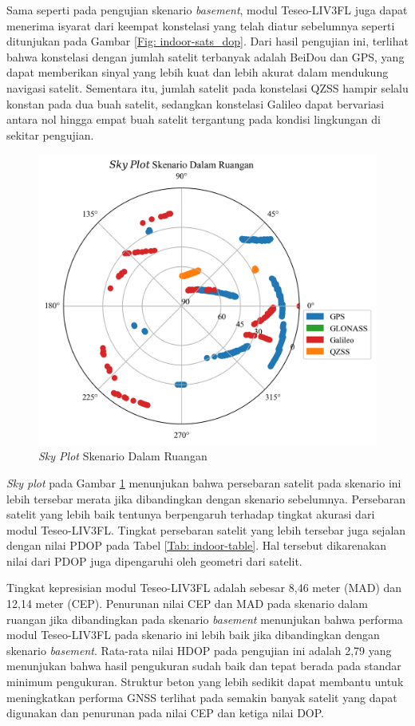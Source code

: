 Sama seperti pada pengujian skenario \textit{basement}, modul Teseo-LIV3FL juga dapat menerima isyarat dari keempat konstelasi yang telah diatur sebelumnya seperti ditunjukan pada Gambar \ref{Fig: indoor-sats_dop}. Dari hasil pengujian ini, terlihat bahwa konstelasi dengan jumlah satelit terbanyak adalah BeiDou dan GPS, yang dapat memberikan sinyal yang lebih kuat dan lebih akurat dalam mendukung navigasi satelit. Sementara itu, jumlah satelit pada konstelasi QZSS hampir selalu konstan pada dua buah satelit, sedangkan konstelasi Galileo dapat bervariasi antara nol hingga empat buah satelit tergantung pada kondisi lingkungan di sekitar pengujian. 

\begin{figure}[H]
	\centering
	\captionsetup{justification=centering}
	\includegraphics[width=12cm]{contents/chapter-4/2-skenario-indoor/sky_plot.png}
	\caption{\textit{Sky Plot} Skenario Dalam Ruangan}
	\label{Fig: indoor-sky_plot}
\end{figure}

\textit{Sky plot} pada Gambar \ref{Fig: indoor-sky_plot} menunjukan bahwa persebaran satelit pada skenario ini lebih tersebar merata jika dibandingkan dengan skenario sebelumnya. Persebaran satelit yang lebih baik tentunya berpengaruh terhadap tingkat akurasi dari modul Teseo-LIV3FL. Tingkat persebaran satelit yang lebih tersebar juga sejalan dengan nilai PDOP pada Tabel \ref{Tab: indoor-table}. Hal tersebut dikarenakan nilai dari PDOP juga dipengaruhi oleh geometri dari satelit.

Tingkat kepresisian modul Teseo-LIV3FL adalah sebesar 8,46 meter (MAD) dan 12,14 meter (CEP). Penurunan nilai CEP dan MAD pada skenario dalam ruangan jika dibandingkan pada skenario \textit{basement} menunjukan bahwa performa modul Teseo-LIV3FL pada skenario ini lebih baik jika dibandingkan dengan skenario \textit{basement}. Rata-rata nilai HDOP pada pengujian ini adalah 2,79 yang menunjukan bahwa hasil pengukuran sudah baik dan tepat berada pada standar minimum pengukuran. Struktur beton yang lebih sedikit dapat membantu untuk meningkatkan performa GNSS terlihat pada semakin banyak satelit yang dapat digunakan dan penurunan pada nilai CEP dan ketiga nilai DOP.

